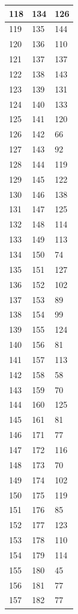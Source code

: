 \begin{tabular}{p{}p{}p{}}
\hline
118 & 134 & 126 \\
\hline
119 & 135 & 144 \\
\hline
120 & 136 & 110 \\
\hline
121 & 137 & 137 \\
\hline
122 & 138 & 143 \\
\hline
123 & 139 & 131 \\
\hline
124 & 140 & 133 \\
\hline
125 & 141 & 120 \\
\hline
126 & 142 & 66 \\
\hline
127 & 143 & 92 \\
\hline
128 & 144 & 119 \\
\hline
129 & 145 & 122 \\
\hline
130 & 146 & 138 \\
\hline
131 & 147 & 125 \\
\hline
132 & 148 & 114 \\
\hline
133 & 149 & 113 \\
\hline
134 & 150 & 74 \\
\hline
135 & 151 & 127 \\
\hline
136 & 152 & 102 \\
\hline
137 & 153 & 89 \\
\hline
138 & 154 & 99 \\
\hline
139 & 155 & 124 \\
\hline
140 & 156 & 81 \\
\hline
141 & 157 & 113 \\
\hline
142 & 158 & 58 \\
\hline
143 & 159 & 70 \\
\hline
144 & 160 & 125 \\
\hline
145 & 161 & 81 \\
\hline
146 & 171 & 77 \\
\hline
147 & 172 & 116 \\
\hline
148 & 173 & 70 \\
\hline
149 & 174 & 102 \\
\hline
150 & 175 & 119 \\
\hline
151 & 176 & 85 \\
\hline
152 & 177 & 123 \\
\hline
153 & 178 & 110 \\
\hline
154 & 179 & 114 \\
\hline
155 & 180 & 45 \\
\hline
156 & 181 & 77 \\
\hline
157 & 182 & 77 \\

\end{tabular}
